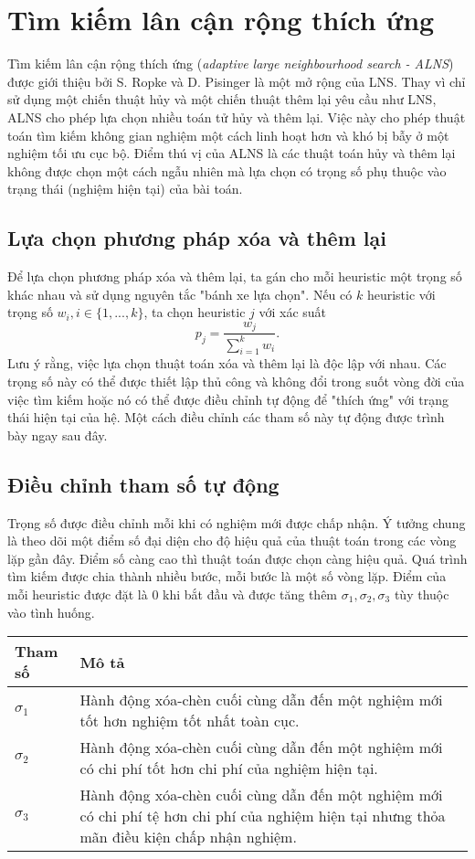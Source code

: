 \section{Tìm kiếm lân cận rộng thích ứng}
Tìm kiếm lân cận rộng thích ứng (\textit{adaptive large neighbourhood search - ALNS}) được giới thiệu bởi S. Ropke và D. Pisinger \cite{ropke2006adaptive} là một mở rộng của LNS. Thay vì chỉ sử dụng một chiến thuật hủy và một chiến thuật thêm lại yêu cầu như LNS, ALNS cho phép lựa chọn nhiều toán tử hủy và thêm lại. Việc này cho phép thuật toán tìm kiếm không gian nghiệm một cách linh hoạt hơn và khó bị bẫy ở một nghiệm tối ưu cục bộ. Điểm thú vị của ALNS là các thuật toán hủy và thêm lại không được chọn một cách ngẫu nhiên mà lựa chọn có trọng số phụ thuộc vào trạng thái (nghiệm hiện tại) của bài toán.

\subsection{Lựa chọn phương pháp xóa và thêm lại}
Để lựa chọn phương pháp xóa và thêm lại, ta gán cho mỗi heuristic một trọng số khác nhau và sử dụng nguyên tắc "bánh xe lựa chọn". Nếu có $k$ heuristic với trọng số $w_i, i \in \{1,...,k\}$, ta chọn heuristic $j$ với xác suất
\begin{equation}
	\label{eq:select}
	p_j = \frac{w_j}{\sum_{i=1}^k w_i}.
\end{equation}
Lưu ý rằng, việc lựa chọn thuật toán xóa và thêm lại là độc lập với nhau. Các trọng số này có thể được thiết lập thủ công và không đổi trong suốt vòng đời của việc tìm kiếm hoặc nó có thể được điều chỉnh tự động để "thích ứng" với trạng thái hiện tại của hệ. Một cách điều chỉnh các tham số này tự động được trình bày ngay sau đây.

\subsection{Điều chỉnh tham số tự động}
Trọng số được điều chỉnh mỗi khi có nghiệm mới được chấp nhận. Ý tưởng chung là theo dõi một điểm số đại diện cho độ hiệu quả của thuật toán trong các vòng lặp gần đây. Điểm số càng cao thì thuật toán được chọn càng hiệu quả. Quá trình tìm kiếm được chia thành nhiều bước, mỗi bước là một số vòng lặp. Điểm của mỗi heuristic được đặt là $0$ khi bắt đầu và được tăng thêm $\sigma_1, \sigma_2, \sigma_3$ tùy thuộc vào tình huống.
\begin{table}[caption={Tham số cập nhật trọng số.}, label=tab:weight]
	\begin{tabularx}{\textwidth}{|l|X|}
		\hline
		Tham số    & Mô tả  \\ \hline
		$\sigma_1$ & Hành động xóa-chèn cuối cùng dẫn đến một nghiệm mới tốt hơn nghiệm tốt nhất toàn cục. \\ \hline
		$\sigma_2$ & Hành động xóa-chèn cuối cùng dẫn đến một nghiệm mới có chi phí tốt hơn chi phí của nghiệm hiện tại. \\ \hline
		$\sigma_3$ & Hành động xóa-chèn cuối cùng dẫn đến một nghiệm mới có chi phí tệ hơn chi phí của nghiệm hiện tại nhưng thỏa mãn điều kiện chấp nhận nghiệm. \\ \hline
	\end{tabularx}
\end{table}

